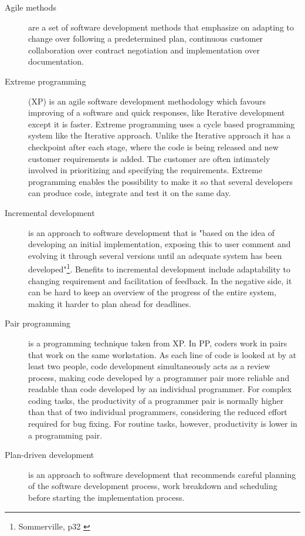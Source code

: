 \begin{description}

\item[Agile methods] \label{def:agile} are a set of software development methods that emphasize on adapting to change over following a predetermined plan, continuous customer collaboration over contract negotiation and implementation over documentation.

\item[Extreme programming] (XP) is an agile software development methodology which favours improving of a software and quick responses, like Iterative development except it is faster. Extreme programming uses a cycle based programming system like the Iterative approach. Unlike the Iterative approach it has a checkpoint after each stage, where the code is being released and new customer requirements is added. The customer are often intimately involved in prioritizing and specifying the requirements. Extreme programming enables the possibility to make it so that several developers can produce code, integrate and test it on the same day.  %

\item[Incremental development] \label{def:incrementalDev} is an approach to software development that is "based on the idea of developing an initial implementation, exposing this to user comment and evolving it through several versions until an adequate system has been developed"\footnote{Sommerville, p32 \cite{sommerville}}. Benefits to incremental development include adaptability to changing requirement and facilitation of feedback. In the negative side, it can be hard to keep an overview of the progress of the entire system, making it harder to plan ahead for deadlines.

\item[Pair programming] \label{def:pairprogram} is a programming technique taken from XP. In PP, coders work in pairs that work on the same workstation. As each line of code is looked at by at least two people, code development simultaneously acts as a review process, making code developed by a programmer pair more reliable and readable than code developed by an individual programmer. For complex coding tasks, the productivity of a programmer pair is normally higher than that of two individual programmers, considering the reduced effort required for bug fixing. For routine tasks, however, productivity is lower in a programming pair.

\item[Plan-driven development] \label{def:plan-driven} is an approach to software development that recommends careful planning of the software development process, work breakdown and scheduling before starting the implementation process. 


\end{description}

